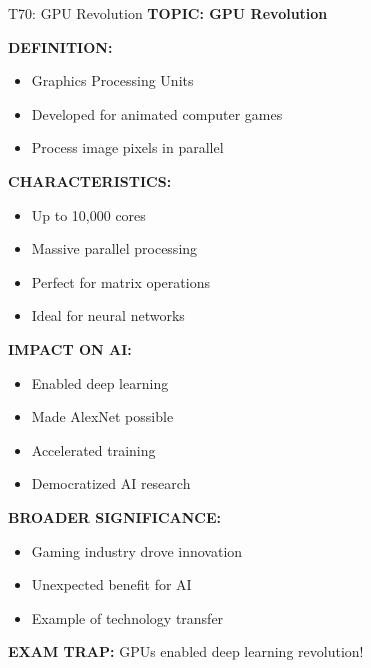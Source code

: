 \documentclass[8pt]{beamer}
\begin{document}
	\begin{frame}{T70: GPU Revolution}
		\fontsize{6.5}{7.5}\selectfont
		\textbf{TOPIC: GPU Revolution}
		
		\vspace{0.1cm}
		\textbf{DEFINITION:}
		\begin{itemize}
			\item Graphics Processing Units
			\item Developed for animated computer games
			\item Process image pixels in parallel
		\end{itemize}
		
		\vspace{0.1cm}
		\textbf{CHARACTERISTICS:}
		\begin{itemize}
			\item Up to 10,000 cores
			\item Massive parallel processing
			\item Perfect for matrix operations
			\item Ideal for neural networks
		\end{itemize}
		
		\vspace{0.1cm}
		\textbf{IMPACT ON AI:}
		\begin{itemize}
			\item Enabled deep learning
			\item Made AlexNet possible
			\item Accelerated training
			\item Democratized AI research
		\end{itemize}
		
		\vspace{0.1cm}
		\textbf{BROADER SIGNIFICANCE:}
		\begin{itemize}
			\item Gaming industry drove innovation
			\item Unexpected benefit for AI
			\item Example of technology transfer
		\end{itemize}
		
		\textcolor{myred}{\textbf{EXAM TRAP:}} GPUs enabled \textcolor{myblue}{deep learning revolution}!
	\end{frame}
	
\end{document}
